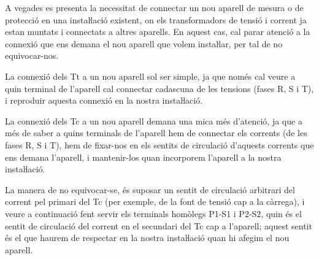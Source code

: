 A vegades es presenta la necessitat de connectar un nou aparell de
mesura o de protecció en una instaŀlació existent, on els
transformadors de tensió i corrent ja estan muntats i connectats a
altres aparells. En aquest cas, cal parar atenció a la connexió
que ens demana el nou aparell que volem instaŀlar, per tal de no
equivocar-nos.

La connexió dels Tt a un nou aparell sol ser simple, ja que només
cal veure a quin terminal de l'aparell cal connectar cadascuna de
les tensions (fases R, S i T), i reproduir aquesta connexió en la
nostra instaŀlació.

La connexió dels Tc a un nou aparell demana una mica més
d'atenció, ja que a més de saber a  quins terminals de l'aparell hem
de connectar els corrents (de les fases R, S i T), hem de fixar-nos
en els sentits de circulació d'aquests corrents que ens demana
l'aparell, i mantenir-los quan incorporem l'aparell a la nostra
instaŀlació.

 La manera de no equivocar-se, és suposar un sentit de
circulació arbitrari del corrent  pel primari del Tc (per exemple,
de la font de tensió cap a la càrrega), i veure a continuació fent
servir els terminals homòlegs P1-S1 i P2-S2, quin és el sentit de
circulació del corrent en el secundari del Tc cap a l'aparell;
aquest sentit és el que haurem de respectar en la nostra
instaŀlació quan hi afegim el nou aparell.


